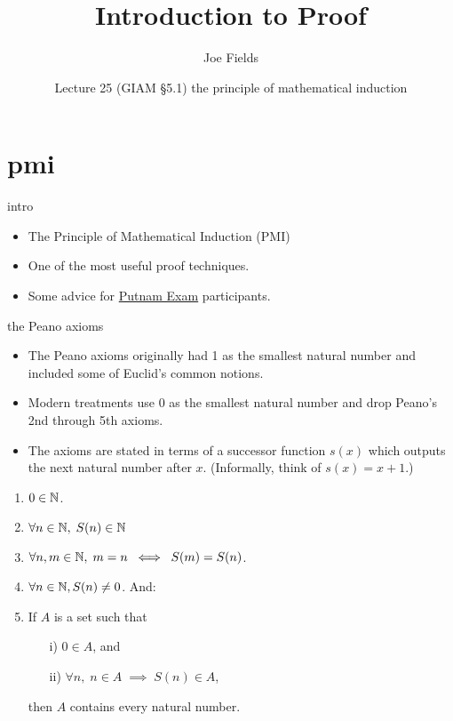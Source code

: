 \documentclass[handout,landscape]{beamer}
\author{Joe Fields}
\title{Introduction to Proof}
\date{Lecture 25 (GIAM \S 5.1) \newline the principle of mathematical induction}
\institute[SCSU]{ {\tt fieldsj1@southernct.edu} }
\begin{document}
\begin{frame}[plain]
  \titlepage
\end{frame}

\section{pmi}

\begin{frame}{intro}
\begin{itemize}
\item The Principle of Mathematical Induction (PMI) \pause
\item One of the most useful proof techniques. \pause
\item Some advice for \href{https://www.maa.org/math-competitions/putnam-competition}{Putnam Exam} participants.
\end{itemize}
\end{frame}


\begin{frame}{the Peano axioms}
\begin{itemize}
\item The Peano axioms originally had 1 as the smallest natural number and included some of Euclid's common notions. \pause
\item Modern treatments use 0 as the smallest natural number and drop Peano's 2nd through 5th axioms. \pause 
\item The axioms are stated in terms of a successor function $s(x)$ which outputs the next natural number after $x$. \pause \newline (Informally, think of $s(x) = x+1$.) \pause
\end{itemize}
\begin{enumerate}
\item $0\in {\mathbb N}$. \pause
\item $\forall n \in {\mathbb N}, \; S(n) \in {\mathbb N}$ \pause
\item $\forall n, m \in {\mathbb N}, \; m = n \; \iff \; S(m) = S(n)$. \pause
\item $\forall n \in {\mathbb N}, S(n) \neq 0$.\pause \newline
And: \pause
\item If $A$ is a set such that
\begin{enumerate}
\item[i)] $0 \in A$, and
\item[ii)]  $\forall n, \; n \in A \; \implies \; S(n) \in A$,
\end{enumerate}
then $A$ contains every natural number.
\end{enumerate}
\end{frame}
\end{document}
